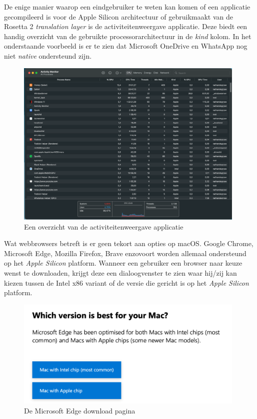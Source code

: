 De enige manier waarop een eindgebruiker te weten kan komen of een applicatie gecompileerd is voor de Apple Silicon architectuur of gebruikmaakt van de Rosetta 2 \textit{translation layer} is de activiteitenweergave applicatie. Deze biedt een handig overzicht van de gebruikte processorarchitectuur in de \textit{kind} kolom. In het onderstaande voorbeeld is er te zien dat Microsoft OneDrive en WhatsApp nog niet \textit{native} ondersteund zijn.

\begin{figure}[!h]
	\centering
	\includegraphics[width=110mm, scale=0.7]{img/activitymonitor_macOSM1.png}
	\caption{Een overzicht van de activiteitenweergave applicatie}
\end{figure}

Wat webbrowsers betreft is er geen tekort aan opties op macOS. Google Chrome, Microsoft Edge, Mozilla Firefox, Brave enzovoort worden allemaal ondersteund op het \textit{Apple Silicon} platform. Wanneer een gebruiker een browser naar keuze wenst te downloaden, krijgt deze een dialoogvenster te zien waar hij/zij kan kiezen tussen de Intel x86 variant of de versie die gericht is op het \textit{Apple Silicon} platform.

\begin{figure}[!h]
	\centering
	\includegraphics[width=110mm, scale=0.7]{img/browserversie_macOSM1.png}
	\caption{De Microsoft Edge download pagina \autocite{Microsoft2022}}
\end{figure}

